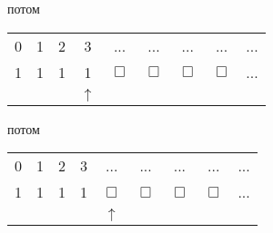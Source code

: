 \documentclass[russian]{lecture-notes}
\begin{document}
\begin{example}
        потом

        \begin{table}[H]

            \centering
            \begin{tabular}{ *{9}{c} }
                \cline{1-9}
                \multicolumn{1}{|c}{0} &
                \multicolumn{1}{|c}{1} &
                \multicolumn{1}{|c}{2} &
                \multicolumn{1}{|c}{3} &
                \multicolumn{1}{|c}{...} &
                \multicolumn{1}{|c}{...} &
                \multicolumn{1}{|c}{...} &
                \multicolumn{1}{|c}{...} &
                \multicolumn{1}{|c|}{...} \\
                \cline{1-9}
                \cline{1-9}
                \multicolumn{1}{|c}{1} &
                \multicolumn{1}{|c}{1} &
                \multicolumn{1}{|c}{1} &
                \multicolumn{1}{|c}{1} &
                \multicolumn{1}{|c}{$\Box$} &
                \multicolumn{1}{|c}{$\Box$} &
                \multicolumn{1}{|c}{$\Box$} &
                \multicolumn{1}{|c}{$\Box$} &
                \multicolumn{1}{|c|}{...} \\
                \cline{1-9}
                & & & $\uparrow$
            \end{tabular}
        \end{table}

        потом

        \begin{table}[H]

            \centering
            \begin{tabular}{ *{9}{c} }
                \cline{1-9}
                \multicolumn{1}{|c}{0} &
                \multicolumn{1}{|c}{1} &
                \multicolumn{1}{|c}{2} &
                \multicolumn{1}{|c}{3} &
                \multicolumn{1}{|c}{...} &
                \multicolumn{1}{|c}{...} &
                \multicolumn{1}{|c}{...} &
                \multicolumn{1}{|c}{...} &
                \multicolumn{1}{|c|}{...} \\
                \cline{1-9}
                \cline{1-9}
                \multicolumn{1}{|c}{1} &
                \multicolumn{1}{|c}{1} &
                \multicolumn{1}{|c}{1} &
                \multicolumn{1}{|c}{1} &
                \multicolumn{1}{|c}{$\Box$} &
                \multicolumn{1}{|c}{$\Box$} &
                \multicolumn{1}{|c}{$\Box$} &
                \multicolumn{1}{|c}{$\Box$} &
                \multicolumn{1}{|c|}{...} \\
                \cline{1-9}
                & & & & $\uparrow$
            \end{tabular}
        \end{table}


\end{example}
\end{document}
